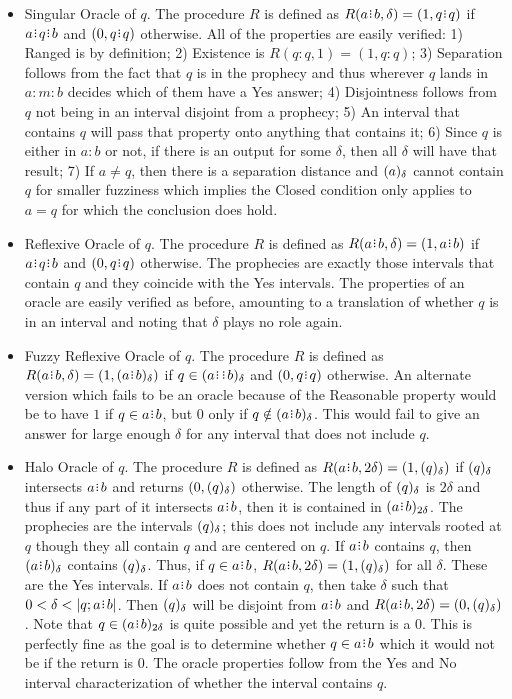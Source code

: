 \documentclass[12pt]{article}
\begin{document}
\begin{itemize}
    \item Singular Oracle of $q$. The procedure $R$ is defined as $R(a \rint b,\delta) = (1, q \rint q)$ if $a \rint q \rint b$ and $(0, q \rint q)$ otherwise. All of the properties are easily verified: 1) Ranged is by definition; 2) Existence is $R(q:q, 1) = (1, q:q)$; 3) Separation follows from the fact that $q$ is in the prophecy and thus wherever $q$ lands in $a:m:b$ decides which of them have a Yes answer; 4) Disjointness follows from $q$ not being in an interval disjoint from a prophecy; 5) An interval that contains $q$ will pass that property onto anything that contains it; 6) Since $q$ is either in $a:b$ or not, if there is an output for some $\delta$, then all $\delta$ will have that result; 7) If $a \neq q$, then there is a separation distance and $(a)_{\delta}$ cannot contain $q$ for smaller fuzziness which implies the Closed condition only applies to $a=q$ for which the conclusion does hold. 
    
    \item Reflexive Oracle of $q$. The procedure $R$ is defined as $R(a\rint b, \delta) = (1, a\rint b)$ if $a\rint q \rint b$ and $(0, q \rint q)$ otherwise. The prophecies are exactly those intervals that contain $q$ and they coincide with the Yes intervals. The properties of an oracle are easily verified as before, amounting to a translation of whether $q$ is in  an interval and noting that $\delta$ plays no role again.

    \item Fuzzy Reflexive Oracle of $q$. The procedure $R$ is defined as $R(a\rint b, \delta) = (1, \halo{a\rint b})$ if $q \in \halo{a\rint  \rint b}$ and $(0, q \rint q)$ otherwise. An alternate version which fails to be an oracle because of the Reasonable property would be to have $1$ if $q \in a \rint b$, but $0$ only if $q \notin \halo{a \rint b}$. This would fail to give an answer for large enough $\delta$ for any interval that does not include $q$. 
    
    \item Halo Oracle of $q$. The procedure $R$ is defined as $R(a\rint b, 2\delta) = (1, \halo{q})$ if $(q)_{\delta}$ intersects $a\rint b$ and returns $(0, (q)_{\delta})$ otherwise. The length of $(q)_{\delta}$ is $2\delta$ and thus if any part of it intersects $a \rint b$, then it is contained in $\halo[2\delta]{a \rint b}$. The prophecies are the intervals $(q)_{\delta}$; this does not include any intervals rooted at $q$ though they all contain $q$ and are centered on $q$. If $a \rint b$ contains $q$, then $\halo{a \rint b}$ contains $(q)_{\delta}$. Thus, if $q \in a \rint b$, $R(a \rint b, 2\delta) = (1, \halo{q})$ for all $\delta$. These are the Yes intervals. If $a \rint b$ does not contain $q$, then take $\delta$ such that $0 < \delta < |q; a \rint b|$. Then $(q)_{\delta}$ will be disjoint from $a \rint b$ and $R(a \rint b, 2\delta) = (0, \halo{q})$. Note that $q \in \halo[2\delta]{a \rint b}$ is quite possible and yet the return is a $0$. This is perfectly fine as the goal is to determine whether $q \in a \rint b$ which it would not be if the return is 0. The oracle properties follow from the Yes and No interval characterization of whether the interval contains $q$. 
    

\end{itemize}
\end{document}
